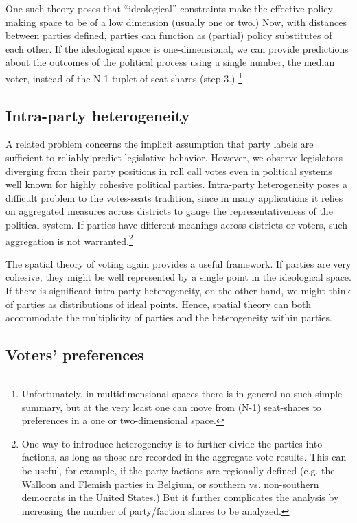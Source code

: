 One such theory poses that ``ideological'' constraints make the effective policy making space to be of a low dimension (usually one or two.) Now, with distances between parties defined,  parties can function as (partial) policy substitutes of each other. If the ideological space is one-dimensional, we can provide predictions about the outcomes of the political process using a single number, the median voter, instead of the N-1 tuplet of seat shares (step 3.) \citep{enelow:1984}\footnote{Unfortunately, in multidimensional spaces there is in general no such simple summary, but at the very least one can move from (N-1) seat-shares to preferences in a one or two-dimensional space.}

\subsection*{Intra-party heterogeneity }

A related problem concerns the implicit assumption that party labels are sufficient to reliably predict legislative behavior.  However, we observe legislators diverging from their party positions in roll call votes even in political systems well known for highly cohesive political parties.\cite{carey:2007}  Intra-party heterogeneity poses a difficult problem to the votes-seats tradition, since in many applications it relies on aggregated measures across districts to gauge the representativeness of the political system. If parties have different meanings across districts or voters, such aggregation is not warranted.\footnote{One way to introduce heterogeneity is to further divide the parties into factions, as long as those are recorded in the aggregate vote results. This can be useful, for example, if the party factions are regionally defined (e.g. the Walloon and Flemish parties in Belgium, or southern vs. non-southern democrats in the United States.) But it further complicates the analysis by increasing the number of party/faction shares to be analyzed.}

The spatial theory of voting again provides a useful framework. If parties are very cohesive, they might be well represented by a single point in the ideological space. If there is significant intra-party heterogeneity, on the other hand, we might think of parties as distributions of ideal points. Hence, spatial theory can both accommodate the multiplicity of parties and the heterogeneity within parties. 

\subsection*{Voters' preferences}

